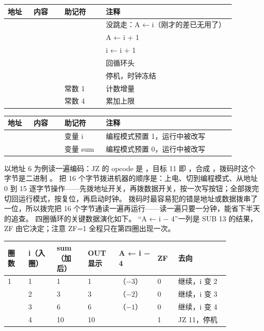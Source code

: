 \begin{longtable}{L{0.10\linewidth}L{0.12\linewidth}L{0.16\linewidth}L{0.50\linewidth}}
\toprule
地址 & 内容 & 助记符 & 注释 \\
\midrule
{} &  &  & 没跳走：A ← i（刚才的差已无用了） \\\tablerowrule
{} &  &  & A ← i + 1 \\\tablerowrule
{} &  &  & i ← i + 1 \\\tablerowrule
{} &  &  & 回循环头 \\\tablerowrule
{} &  &  & 停机，时钟冻结 \\\tablerowrule
{} &  & 常数 1 & 计数增量 \\\tablerowrule
{} &  & 常数 4 & 累加上限 \\
\bottomrule
\end{longtable}

\begin{longtable}{L{0.10\linewidth}L{0.12\linewidth}L{0.16\linewidth}L{0.50\linewidth}}
\toprule
地址 & 内容 & 助记符 & 注释 \\
\midrule
{} &  & 变量 i & 编程模式预置 1，运行中被改写 \\\tablerowrule
{} &  & 变量 sum & 编程模式预置 0，运行中被改写 \\
\bottomrule
\end{longtable}

以地址 6 为例读一遍编码：JZ 的 opcode 是 ，目标 11 即 ，合成 ，拨码时这个字节是二进制 。
把 16 个字节拨进机器的顺序是：上电、切到编程模式、从地址 0 到 15 逐字节操作——先拨地址开关，再拨数据开关，按一次写按钮；全部拨完切回运行模式，按复位，再启动时钟。
拨码时最容易犯的错是地址或数据拨串了一位，所以拨完把 16 个字节通读一遍再运行——读一遍只要一分钟，能省下半天的追查。
四圈循环的关键数据演化如下。
“A ← i − 4”一列是 SUB 13 的结果，ZF 由它决定；注意 ZF=1 全程只在第四圈出现一次。

\begin{longtable}{L{0.08\linewidth}L{0.11\linewidth}L{0.12\linewidth}L{0.12\linewidth}L{0.15\linewidth}L{0.08\linewidth}L{0.20\linewidth}}
\toprule
圈数 & i（入圈） & sum（加后） & OUT 显示 & A ← i − 4 & ZF & 去向 \\
 & 1 & 1 & 1 & （$-3$） & 0 & 继续，i 变 2 \\ & 2 & 3 & 3 & （$-2$） & 0 & 继续，i 变 3 \\ & 3 & 6 & 6 & （$-1$） & 0 & 继续，i 变 4 \\ & 4 & 10 & 10 &  & 1 & JZ 11，停机 \\
\bottomrule
\end{longtable}


